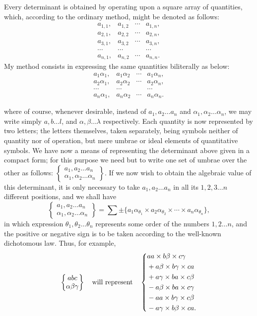 \documentclass[11pt]{article}
\newcommand{\sourcepage}[1]{\marginpar{\scriptsize p.~#1}}
\newcommand{\bd}[2]{\left\{\begin{matrix}#1\\#2\end{matrix}\right\}}
\begin{document}
{{Every determinant is obtained by operating upon a square array of quantities, which, according to the ordinary method, might be denoted as follows:
\[
\begin{matrix}
a_{1,1},&a_{1,2}&\cdots&a_{1,n},\\
a_{2,1},&a_{2,2}&\cdots&a_{2,n},\\
a_{3,1},&a_{3,2}&\cdots&a_{3,n},\\
\cdots&\cdots&&\cdots\\
a_{n,1},&a_{n,2}&\cdots&a_{n,n}.
\end{matrix}
\]
My method consists in expressing the same quantities biliterally as below:
\[
\begin{matrix}
a_1\alpha_1,&a_1\alpha_2&\cdots&a_1\alpha_n,\\
a_2\alpha_1,&a_2\alpha_2&\cdots&a_2\alpha_n,\\
\cdots&\cdots&&\cdots\\
a_n\alpha_1,&a_n\alpha_2&\cdots&a_n\alpha_n.
\end{matrix}
\]

\sourcepage{242}
where of course, whenever desirable, instead of $a_1,a_2\ldots a_n$ and $\alpha_1,\alpha_2\ldots\alpha_n$, we may write simply $a,b\ldots l$, and $\alpha,\beta\ldots\lambda$ respectively. Each quantity is now represented by two letters; the letters themselves, taken separately, being symbols neither of quantity nor of operation, but mere umbrae or ideal elements of quantitative symbols. We have now a means of representing the determinant above given in a compact form; for this purpose we need but to write one set of umbrae over the other as follows: $\bd{a_1,a_2\ldots a_n}{\alpha_1,\alpha_2\ldots\alpha_n}$. If we now wish to obtain the algebraic value of this determinant, it is only necessary to take $a_1,a_2\ldots a_n$ in all its $1,2,3\ldots n$ different positions, and we shall have
\[
 \bd{a_1,a_2\ldots a_n}{\alpha_1,\alpha_2\ldots\alpha_n}
 = \sum \pm\{a_1\alpha_{\theta_1}\times a_2\alpha_{\theta_2}\times\cdots\times a_n\alpha_{\theta_n}\},
\]
in which expression $\theta_1,\theta_2\ldots\theta_n$ represents some order of the numbers $1,2\ldots n$, and the positive or negative sign is to be taken according to the well-known dichotomous law. Thus, for example,
\[
\bd{abc}{\alpha\beta\gamma}\quad\hbox{will represent}\quad
\left\{
\begin{aligned}
&aa\times b\beta\times c\gamma\\
&+a\beta\times b\gamma\times ca\\
&+a\gamma\times ba\times c\beta\\
&-a\beta\times ba\times c\gamma\\
&-aa\times b\gamma\times c\beta\\
&-a\gamma\times b\beta\times ca.
\end{aligned}
\right.
\]

}}
\end{document}
